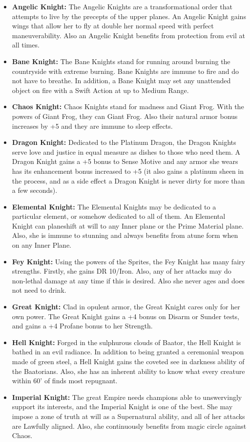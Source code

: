 \documentclass[10pt]{article}
\newcommand{\ability}[2]{\smallskip \noindent \textbf{#1} #2}
\newcommand{\itemspace}[0]{\setlength{\itemsep}{-1mm}}
\begin{document}
\begin{itemize}\itemspace
    \item \ability{Angelic Knight:}{The Angelic Knights are a transformational order that attempts to live by the precepts of the upper planes. An Angelic Knight gains wings that allow her to fly at double her normal speed with perfect maneuverability. Also an Angelic Knight benefits from protection from evil at all times.}
    \item \ability{Bane Knight:}{The Bane Knights stand for running around burning the countryside with extreme burning. Bane Knights are immune to fire and do not have to breathe. In addition, a Bane Knight may set any unattended object on fire with a Swift Action at up to Medium Range.}
    \item \ability{Chaos Knight:}{Chaos Knights stand for madness and Giant Frog. With the powers of Giant Frog, they can Giant Frog. Also their natural armor bonus increases by +5 and they are immune to sleep effects.}
    \item \ability{Dragon Knight:}{Dedicated to the Platinum Dragon, the Dragon Knights serve love and justice in equal measure as dishes to those who need them. A Dragon Knight gains a +5 bonus to Sense Motive and any armor she wears has its enhancement bonus increased to +5 (it also gains a platinum sheen in the process, and as a side effect a Dragon Knight is never dirty for more than a few seconds).}
    \item \ability{Elemental Knight:}{The Elemental Knights may be dedicated to a particular element, or somehow dedicated to all of them. An Elemental Knight can planeshift at will to any Inner plane or the Prime Material plane. Also, she is immune to stunning and always benefits from atune form when on any Inner Plane.}
    \item \ability{Fey Knight:}{Using the powers of the Sprites, the Fey Knight has many fairy strengths. Firstly, she gains DR 10/Iron. Also, any of her attacks may do non-lethal damage at any time if this is desired. Also she never ages and does not need to drink.}
    \item \ability{Great Knight:}{Clad in opulent armor, the Great Knight cares only for her own power. The Great Knight gains a +4 bonus on Disarm or Sunder tests, and gains a +4 Profane bonus to her Strength.}
    \item \ability{Hell Knight:}{Forged in the sulphurous clouds of Baator, the Hell Knight is bathed in an evil radiance. In addition to being granted a ceremonial weapon made of green steel, a Hell Knight gains the coveted see in darkness ability of the Baatorians. Also, she has an inherent ability to know what every creature within 60' of finds most repugnant.}
    \item \ability{Imperial Knight:}{The great Empire needs champions able to unswervingly support its interests, and the Imperial Knight is one of the best. She may impose a zone of truth at will as a Supernatural ability, and all of her attacks are Lawfully aligned. Also, she continuously benefits from magic circle against Chaos.}
\end{itemize}
\end{document}
